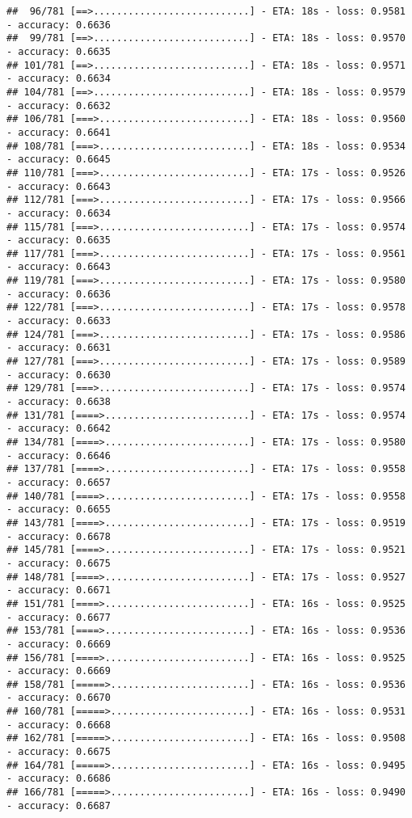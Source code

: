 \documentclass[
]{article}
\begin{document}
\begin{verbatim}
##  96/781 [==>...........................] - ETA: 18s - loss: 0.9581 - accuracy: 0.6636
##  99/781 [==>...........................] - ETA: 18s - loss: 0.9570 - accuracy: 0.6635
## 101/781 [==>...........................] - ETA: 18s - loss: 0.9571 - accuracy: 0.6634
## 104/781 [==>...........................] - ETA: 18s - loss: 0.9579 - accuracy: 0.6632
## 106/781 [===>..........................] - ETA: 18s - loss: 0.9560 - accuracy: 0.6641
## 108/781 [===>..........................] - ETA: 18s - loss: 0.9534 - accuracy: 0.6645
## 110/781 [===>..........................] - ETA: 17s - loss: 0.9526 - accuracy: 0.6643
## 112/781 [===>..........................] - ETA: 17s - loss: 0.9566 - accuracy: 0.6634
## 115/781 [===>..........................] - ETA: 17s - loss: 0.9574 - accuracy: 0.6635
## 117/781 [===>..........................] - ETA: 17s - loss: 0.9561 - accuracy: 0.6643
## 119/781 [===>..........................] - ETA: 17s - loss: 0.9580 - accuracy: 0.6636
## 122/781 [===>..........................] - ETA: 17s - loss: 0.9578 - accuracy: 0.6633
## 124/781 [===>..........................] - ETA: 17s - loss: 0.9586 - accuracy: 0.6631
## 127/781 [===>..........................] - ETA: 17s - loss: 0.9589 - accuracy: 0.6630
## 129/781 [===>..........................] - ETA: 17s - loss: 0.9574 - accuracy: 0.6638
## 131/781 [====>.........................] - ETA: 17s - loss: 0.9574 - accuracy: 0.6642
## 134/781 [====>.........................] - ETA: 17s - loss: 0.9580 - accuracy: 0.6646
## 137/781 [====>.........................] - ETA: 17s - loss: 0.9558 - accuracy: 0.6657
## 140/781 [====>.........................] - ETA: 17s - loss: 0.9558 - accuracy: 0.6655
## 143/781 [====>.........................] - ETA: 17s - loss: 0.9519 - accuracy: 0.6678
## 145/781 [====>.........................] - ETA: 17s - loss: 0.9521 - accuracy: 0.6675
## 148/781 [====>.........................] - ETA: 17s - loss: 0.9527 - accuracy: 0.6671
## 151/781 [====>.........................] - ETA: 16s - loss: 0.9525 - accuracy: 0.6677
## 153/781 [====>.........................] - ETA: 16s - loss: 0.9536 - accuracy: 0.6669
## 156/781 [====>.........................] - ETA: 16s - loss: 0.9525 - accuracy: 0.6669
## 158/781 [=====>........................] - ETA: 16s - loss: 0.9536 - accuracy: 0.6670
## 160/781 [=====>........................] - ETA: 16s - loss: 0.9531 - accuracy: 0.6668
## 162/781 [=====>........................] - ETA: 16s - loss: 0.9508 - accuracy: 0.6675
## 164/781 [=====>........................] - ETA: 16s - loss: 0.9495 - accuracy: 0.6686
## 166/781 [=====>........................] - ETA: 16s - loss: 0.9490 - accuracy: 0.6687

\end{verbatim}
\end{document}
